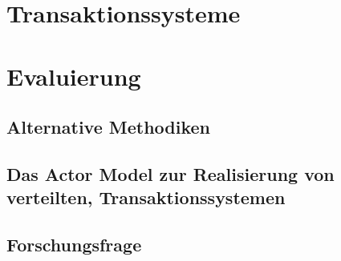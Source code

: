 

\chapter{Transaktionssysteme}
\chapter{Evaluierung}
\section{Alternative Methodiken}
\section{Das Actor Model zur Realisierung von verteilten, Transaktionssystemen} 
\section{Forschungsfrage} 
